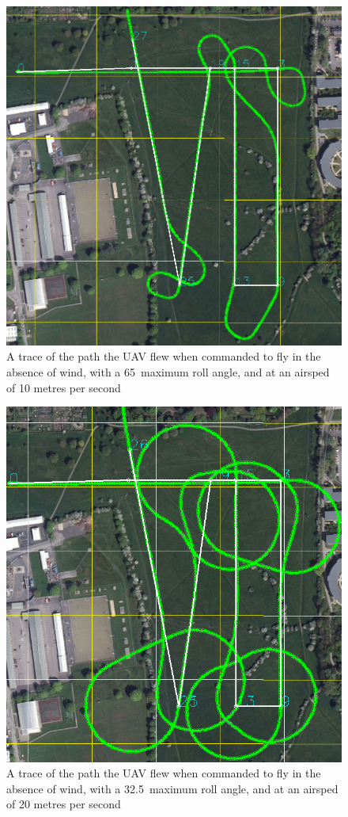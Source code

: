\begin{figure}[htbp!] 
\centering    
\includegraphics[width=\textwidth]{65_10_NoWind}
\caption{A trace of the path the UAV flew when commanded to fly in the absence of wind, with a 65\degree\  maximum roll angle, and at an airsped of 10 metres per second}
\end{figure}

\begin{figure}[htbp!] 
\centering    
\includegraphics[width=\textwidth]{32_20_NoWind}
\caption{A trace of the path the UAV flew when commanded to fly in the absence of wind, with a 32.5\degree\  maximum roll angle, and at an airsped of 20 metres per second}
\end{figure}


